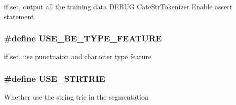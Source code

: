 if set, output all the training data DEBUG CateStrTokenizer Enable assert statement 
\subsubsection{\setlength{\rightskip}{0pt plus 5cm}\#define USE\_\-BE\_\-TYPE\_\-FEATURE}\label{cmacconfig_8h_435943505ae5e7a8712d51341bd05808}


if set, use punctuaion and character type feature 
\subsubsection{\setlength{\rightskip}{0pt plus 5cm}\#define USE\_\-STRTRIE}\label{cmacconfig_8h_fa0bb5c841887bf16853c4e828a8b416}


Whether use the string trie in the segmentation 